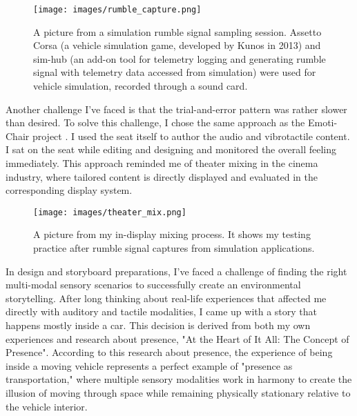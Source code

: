         \begin{figure}[H]
            \centering
            \texttt{[image: images/rumble\_capture.png]}
            \caption{A picture from a simulation rumble signal sampling session. Assetto Corsa (a vehicle simulation game, developed by Kunos in 2013) and sim-hub (an add-on tool for telemetry logging and generating rumble signal with telemetry data accessed from simulation) were used for vehicle simulation, recorded through a sound card.}
            \label{fig:RUMBLE_CAPTURE}
        \end{figure}

        Another challenge I've faced is that the trial-and-error pattern was rather slower than desired. To solve this challenge, I chose the same approach as the Emoti-Chair project \cite{Composing_Vibrotactile_Music}. I used the seat itself to author the audio and vibrotactile content. I sat on the seat while editing and designing and monitored the overall feeling immediately. This approach reminded me of theater mixing in the cinema industry, where tailored content is directly displayed and evaluated in the corresponding display system.\par

        \begin{figure}[H]
            \centering
            \texttt{[image: images/theater\_mix.png]}
            \caption{A picture from my in-display mixing process. It shows my testing practice after rumble signal captures from simulation applications.}
            \label{fig:THEATER_MIX}
        \end{figure}

        In design and storyboard preparations, I've faced a challenge of finding the right multi-modal sensory scenarios to successfully create an environmental storytelling. After long thinking about real-life experiences that affected me directly with auditory and tactile modalities, I came up with a story that happens mostly inside a car. This decision is derived from both my own experiences and research about presence, "At the Heart of It All: The Concept of Presence"\cite{Concept_of_Presence}. According to this research about presence, the experience of being inside a moving vehicle represents a perfect example of "presence as transportation," where multiple sensory modalities work in harmony to create the illusion of moving through space while remaining physically stationary relative to the vehicle interior.\par

